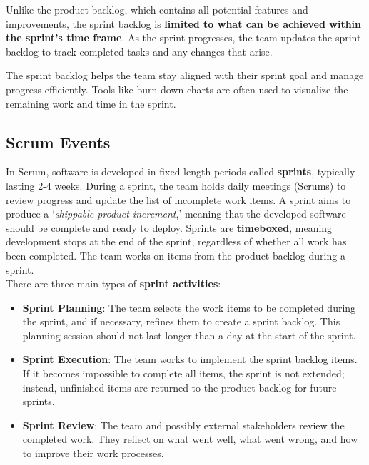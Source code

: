 Unlike the product backlog, which contains all potential features and improvements, the sprint backlog is \textbf{limited to what can be achieved within the sprint’s time frame}. As the sprint progresses, the team updates the sprint backlog to track completed tasks and any changes that arise.

The sprint backlog helps the team stay aligned with their sprint goal and manage progress efficiently. Tools like burn-down charts are often used to visualize the remaining work and time in the sprint.

\subsection{Scrum Events}

In Scrum, software is developed in fixed-length periods called \textbf{sprints}, typically lasting 2-4 weeks. During a sprint, the team holds daily meetings (Scrums) to review progress and update the list of incomplete work items. A sprint aims to produce a ‘\textit{shippable product increment},’ meaning that the developed software should be complete and ready to deploy. Sprints are \textbf{timeboxed}, meaning development stops at the end of the sprint, regardless of whether all work has been completed. The team works on items from the product backlog during a sprint. \\

There are three main types of \textbf{sprint activities}:
\begin{itemize}
    \item \textbf{Sprint Planning}: The team selects the work items to be completed during the sprint, and if necessary, refines them to create a sprint backlog. This planning session should not last longer than a day at the start of the sprint.
    \item \textbf{Sprint Execution}: The team works to implement the sprint backlog items. If it becomes impossible to complete all items, the sprint is not extended; instead, unfinished items are returned to the product backlog for future sprints.
    \item \textbf{Sprint Review}: The team and possibly external stakeholders review the completed work. They reflect on what went well, what went wrong, and how to improve their work processes.
\end{itemize}

